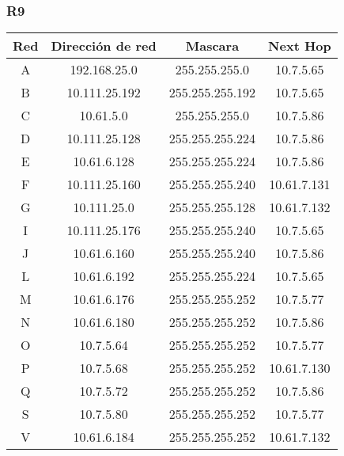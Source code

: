 \subsubsection{R9}
\begin{table}[!htbp]
\centering
  \begin{tabular}{|c|c|c|c|}
    \hline
	Red & Dirección de red & Mascara & Next Hop\\ \hline
	A & 192.168.25.0 & 255.255.255.0 & 10.7.5.65 \\ \hline
	B & 10.111.25.192 & 255.255.255.192 & 10.7.5.65 \\ \hline
	C & 10.61.5.0 & 255.255.255.0 & 10.7.5.86 \\ \hline
	D & 10.111.25.128 & 255.255.255.224 & 10.7.5.86 \\ \hline
	E & 10.61.6.128 & 255.255.255.224 & 10.7.5.86 \\ \hline
	F & 10.111.25.160 & 255.255.255.240 & 10.61.7.131 \\ \hline
	G & 10.111.25.0 & 255.255.255.128 & 10.61.7.132 \\ \hline
	I & 10.111.25.176 & 255.255.255.240 & 10.7.5.65 \\ \hline
	J & 10.61.6.160 & 255.255.255.240 & 10.7.5.86 \\ \hline
	L & 10.61.6.192 & 255.255.255.224 & 10.7.5.65 \\ \hline
	M & 10.61.6.176 & 255.255.255.252 & 10.7.5.77 \\ \hline
	N & 10.61.6.180 & 255.255.255.252 & 10.7.5.86 \\ \hline
	O & 10.7.5.64 & 255.255.255.252 & 10.7.5.77 \\ \hline
	P & 10.7.5.68 & 255.255.255.252 & 10.61.7.130 \\ \hline
	Q & 10.7.5.72 & 255.255.255.252 & 10.7.5.86 \\ \hline
	S & 10.7.5.80 & 255.255.255.252 & 10.7.5.77 \\ \hline
	V & 10.61.6.184 & 255.255.255.252 & 10.61.7.132 \\
    \hline
  \end{tabular}
\end{table}

\newpage

